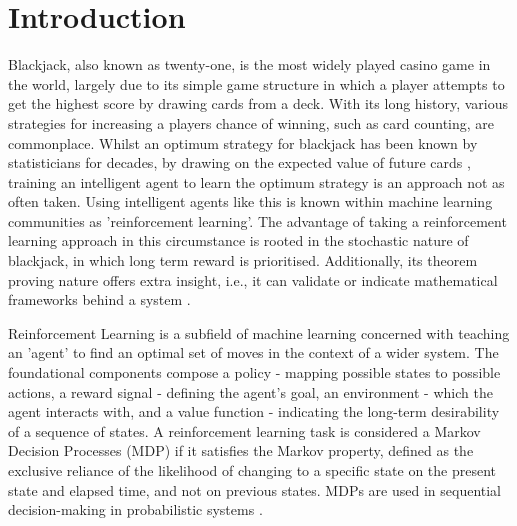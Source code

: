 \section{Introduction}

Blackjack, also known as twenty-one, is the most widely played casino game in the world, largely due to its simple game structure in which a player attempts to get the highest score by drawing cards from a deck. With its long history, various strategies for increasing a players chance of winning, such as card counting, are commonplace. Whilst an optimum strategy for blackjack has been known by statisticians for decades, by drawing on the expected value of future cards \cite{Baldwin01091956}, training an intelligent agent to learn the optimum strategy is an approach not as often taken. Using intelligent agents like this is known within machine learning communities as 'reinforcement learning'. The advantage of taking a reinforcement learning approach in this circumstance is rooted in the stochastic nature of blackjack, in which long term reward is prioritised. Additionally, its theorem proving nature offers extra insight, i.e., it can validate or indicate mathematical frameworks behind a system \cite{bidi2023reinforcementlearningcontroltheory}. 

\smallskip
Reinforcement Learning is a subfield of machine learning concerned with teaching an 'agent' to find an optimal set of moves in the context of a wider system. The foundational components compose a policy - mapping possible states to possible actions, a reward signal - defining the agent's goal, an environment - which the agent interacts with, and a value function - indicating the long-term desirability of a sequence of states. A reinforcement learning task is considered a Markov Decision Processes (MDP) if it satisfies the Markov property, defined as the exclusive reliance of the likelihood of changing to a specific state on the present state and elapsed time, and not on previous states. MDPs are used in sequential decision-making in probabilistic systems \cite{10.5555/3312046}.


